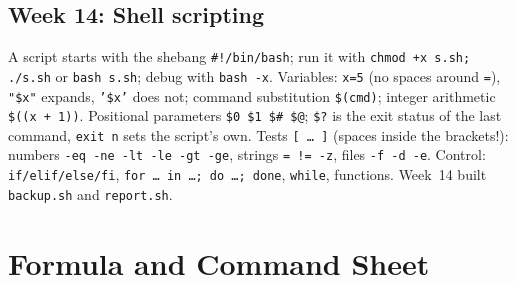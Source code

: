 \documentclass[11pt,a4paper]{article}
\newcommand{\cmd}[1]{\texttt{#1}}
\begin{document}
\subsection{Week 14: Shell scripting}
A script starts with the shebang \texttt{\#!/bin/bash}; run it with \cmd{chmod +x s.sh; ./s.sh} or \cmd{bash s.sh}; debug with \cmd{bash -x}. Variables: \texttt{x=5} (no spaces around \texttt{=}), \texttt{"\$x"} expands, \texttt{'\$x'} does not; command substitution \texttt{\$(cmd)}; integer arithmetic \texttt{\$((x + 1))}. Positional parameters \texttt{\$0 \$1 \$\# \$@}; \texttt{\$?} is the exit status of the last command, \cmd{exit n} sets the script's own. Tests \texttt{[ \dots\ ]} (spaces inside the brackets!): numbers \texttt{-eq -ne -lt -le -gt -ge}, strings \texttt{= != -z}, files \texttt{-f -d -e}. Control: \texttt{if/elif/else/fi}, \texttt{for \dots\ in \dots; do \dots; done}, \texttt{while}, functions. Week~14 built \texttt{backup.sh} and \texttt{report.sh}.


\section{Formula and Command Sheet}
\label{sec:sheet}
\end{document}
